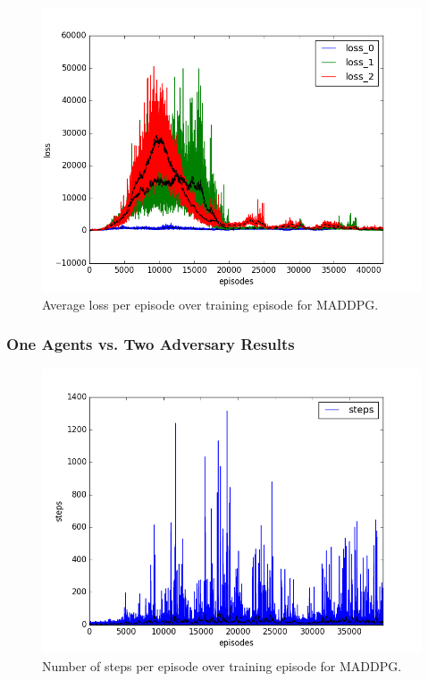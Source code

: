 \begin{figure}[h]
  \centering
  \includegraphics[trim=10 10 10 10,clip,width=\figscale\linewidth]
  {../results/maddpg_1vs2/loss.png}
  \caption{Average loss per episode over training episode for MADDPG.}
  \label{fig:maddpg-1vs2}
\end{figure}
\FloatBarrier


\subsubsection{One Agents vs. Two Adversary Results}
\label{sec:experiment:maddpg:2vs1}


\begin{figure}[h]
  \centering
  \includegraphics[trim=10 10 10 10,clip,width=\figscale\linewidth]
  {../results/maddpg_2vs1/steps.png}
  \caption{Number of steps per episode over training episode for MADDPG.}
  \label{fig:maddpg-2vs1}
\end{figure}
\FloatBarrier


